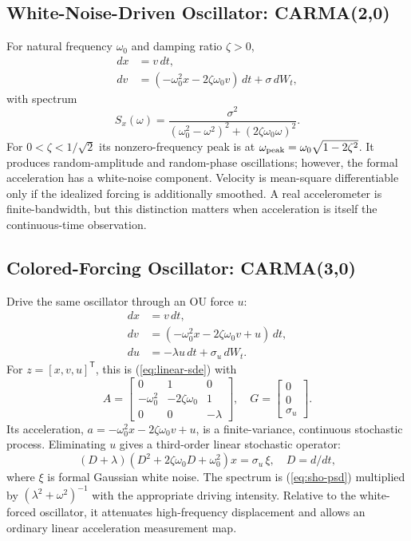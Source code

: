 \documentclass[10pt,journal]{IEEEtran}
\newcommand{\T}{^{\mathsf T}}
\newcommand{\PSD}{S_x}
\begin{document}
\subsection{White-Noise-Driven Oscillator: CARMA(2,0)}
For natural frequency \(\omega_0\) and damping ratio \(\zeta>0\),
\begin{align}
dx &= v\,dt,\nonumber\\
dv &=(-\omega_0^2x-2\zeta\omega_0v)\,dt+\sigma\,dW_t,
\label{eq:sho}
\end{align}
with spectrum
\begin{equation}
\PSD(\omega)=
\frac{\sigma^2}
{(\omega_0^2-\omega^2)^2+
 (2\zeta\omega_0\omega)^2}.
\label{eq:sho-psd}
\end{equation}
For \(0<\zeta<1/\sqrt2\) its nonzero-frequency peak is at
\(\omega_{\rm peak}=\omega_0\sqrt{1-2\zeta^2}\).
It produces random-amplitude and random-phase oscillations; however,
the formal acceleration has a white-noise component. Velocity is
mean-square differentiable only if the idealized forcing is additionally
smoothed. A real accelerometer is finite-bandwidth, but this distinction
matters when acceleration is itself the continuous-time observation.

\subsection{Colored-Forcing Oscillator: CARMA(3,0)}
Drive the same oscillator through an OU force \(u\):
\begin{equation}
\begin{aligned}
dx&=v\,dt,\\
dv&=(-\omega_0^2x-2\zeta\omega_0v+u)\,dt,\\
du&=-\lambda u\,dt+\sigma_u\,dW_t .
\end{aligned}
\label{eq:colored}
\end{equation}
For \(z=[x,v,u]\T\), this is (\ref{eq:linear-sde}) with
\begin{equation}
A=\begin{bmatrix}
0&1&0\\
-\omega_0^2&-2\zeta\omega_0&1\\
0&0&-\lambda
\end{bmatrix},\quad
G=\begin{bmatrix}0\\0\\\sigma_u\end{bmatrix}.
\label{eq:colored-matrix}
\end{equation}
Its acceleration,
\(a=-\omega_0^2x-2\zeta\omega_0v+u\), is a
finite-variance, continuous stochastic process. Eliminating \(u\)
gives a third-order linear stochastic operator:
\begin{equation}
(D+\lambda)(D^2+2\zeta\omega_0D+\omega_0^2)x
=\sigma_u\,\xi,\quad D=d/dt,
\label{eq:colored-carma}
\end{equation}
where \(\xi\) is formal Gaussian white noise. The
spectrum is (\ref{eq:sho-psd}) multiplied by
\((\lambda^2+\omega^2)^{-1}\) with the appropriate driving
intensity. Relative to the white-forced oscillator, it attenuates
high-frequency displacement and allows an ordinary linear
acceleration measurement map.
\end{document}
